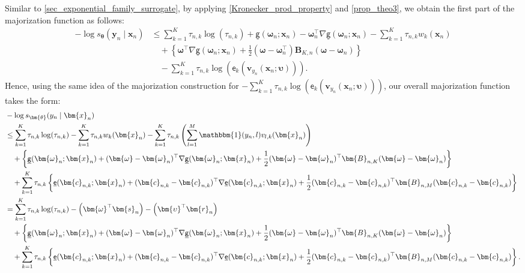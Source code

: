 \documentclass{article}
\newcommand{\nn}{\nonumber} %
\newcommand{\I}{\mathbbm{1}}
\def\sfg{\mathsf{g}}
\def\ex{\mathsf{e}}
\def\vomega{{\bm{\omega}}}
\def\vupsilon{{\bm{\upsilon}}}
\def\vtheta{{\bm{\theta}}}
\def\vc{{\bm{c}}}
\def\vr{{\bm{r}}}
\def\vs{{\bm{s}}}
\def\vv{{\bm{v}}}
\def\vx{{\bm{x}}}
\def\vy{{\bm{y}}}
\def\evv{{v}}
\def\evw{{w}}
\def\mB{{\bm{B}}}
\begin{document}
Similar to \cref{sec_exponential_family_surrogate}, by applying \cref{Kronecker_prod_property} and \cref{prop_theo3}, we obtain the first part of the majorization function as follows:
\begin{align} 
	-\log s_{\vtheta}(\vy_n\mid \vx_n) 
    &\le\sum_{k=1}^{K}\tau_{n,k}\log(\tau_{n,k})+\underline{\sfg}(\vomega_n;\vx_n)-\vomega_{n}^{\top}\nabla \underline{\sfg}(\vomega_n;\vx_n)-\sum_{k=1}^{K}\tau_{n,k}w_k(\vx_n)\nn\\
    &\quad+\left\{\vomega^{\top}\nabla \underline{\sfg}(\vomega_n;\vx_n)+\frac{1}{2}(\vomega-\vomega_{n}^{\top})\mB_{K,n}\left(\vomega-\vomega_n\right)\right\}\nn
   \\
    &\quad-\sum_{k=1}^{K}\tau_{n,k}\log(\ex_k(\vv_{y_n}(\vx_n;\vupsilon))).\label{eq_surrogate_Taylor_SGMLMoE_1} 
\end{align}
Hence, using the same idea of the majorization construction for $-\sum_{k=1}^{K}\tau_{n,k}\log(\ex_k(\vv_{y_n}(\vx_n;\vupsilon)))$, our overall majorization function takes the form:
\begin{align*}
    &-\log s_{\vtheta}(y_n\mid \vx_n) \\
    &\le \sum_{k=1}^{K}\tau_{n,k}\log(\tau_{n,k})-\displaystyle\sum_{k=1}^K\tau_{n,k}\evw_k(\vx_n)-\displaystyle\sum_{k=1}^K\tau_{n,k}\left(\sum_{l=1}^{M}\I(y_n,l)\evv_{l,k}(\vx_n)\right)\\
    &\quad +\left\{\underline{\sfg}(\vomega_n;\vx_n)+ (\vomega-\vomega_n)^{\top}\nabla \underline{\sfg}(\vomega_n;\vx_n)+\frac{1}{2}(\vomega-\vomega_n)^{\top}\mB_{n,K}(\vomega-\vomega_n)\right\} 
   \\
    &\quad +\displaystyle\sum_{k=1}^{K}\tau_{n,k}\left\{\underline{\ex}(\vc_{n,k};\vx_n)+ (\vc_{n,k}-\vc_{n,k})^{\top}\nabla \underline{\ex}(\vc_{n,k};\vx_n)+\frac{1}{2}(\vc_{n,k}-\vc_{n,k})^{\top}\mB_{n,M}(\vc_{n,k}-\vc_{n,k})\right\}\\
    &= \sum_{k=1}^{K}\tau_{n,k}\log(\tau_{n,k})-\left(\vomega^{\top}\vs_n\right)-\left(\vupsilon^{\top}\vr_n \right)\\
    &\quad +\left\{\underline{\sfg}(\vomega_n;\vx_n)+ (\vomega-\vomega_n)^{\top}\nabla \underline{\sfg}(\vomega_n;\vx_n)+\frac{1}{2}(\vomega-\vomega_n)^{\top}\mB_{n,K}(\vomega-\vomega_n)\right\} 
   \\
   &\quad +\displaystyle\sum_{k=1}^{K}\tau_{n,k}\left\{\underline{\ex}(\vc_{n,k};\vx_n)+ (\vc_{n,k}-\vc_{n,k})^{\top}\nabla \underline{\ex}(\vc_{n,k};\vx_n)+\frac{1}{2}(\vc_{n,k}-\vc_{n,k})^{\top}\mB_{n,M}(\vc_{n,k}-\vc_{n,k})\right\}.
\end{align*}
\end{document}
